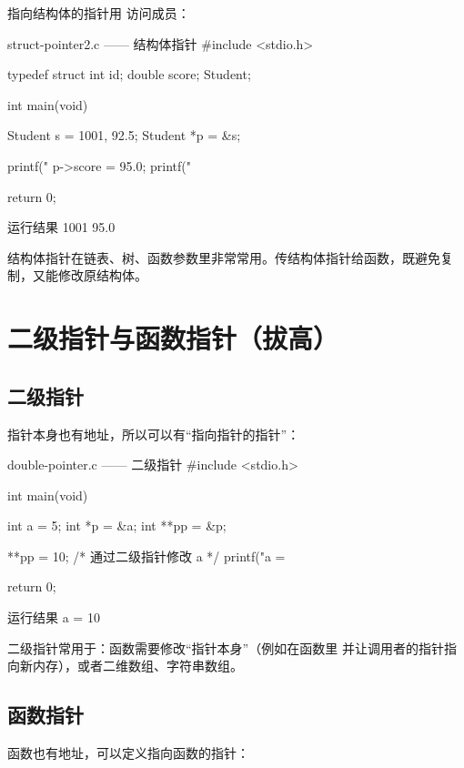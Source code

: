 指向结构体的指针用 \code{->} 访问成员：

\begin{codebox}{struct-pointer2.c —— 结构体指针}
#include <stdio.h>

typedef struct {
    int id;
    double score;
} Student;

int main(void)
{
    Student s = {1001, 92.5};
    Student *p = &s;

    printf("%
    p->score = 95.0;
    printf("%

    return 0;
}
\end{codebox}

\begin{outbox}{运行结果}
1001
95.0
\end{outbox}

结构体指针在链表、树、函数参数里非常常用。传结构体指针给函数，既避免复制，又能修改原结构体。

\section{二级指针与函数指针（拔高）}

\subsection{二级指针}

指针本身也有地址，所以可以有“指向指针的指针”：

\begin{codebox}{double-pointer.c —— 二级指针}
#include <stdio.h>

int main(void)
{
    int a = 5;
    int *p = &a;
    int **pp = &p;

    **pp = 10;          /* 通过二级指针修改 a */
    printf("a = %

    return 0;
}
\end{codebox}

\begin{outbox}{运行结果}
a = 10
\end{outbox}

二级指针常用于：函数需要修改“指针本身”（例如在函数里  并让调用者的指针指向新内存），或者二维数组、字符串数组。

\subsection{函数指针}

函数也有地址，可以定义指向函数的指针：

